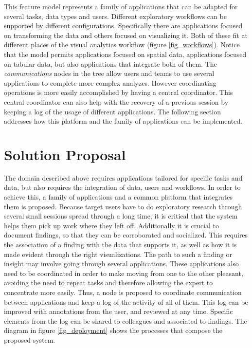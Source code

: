 This feature model represents a family of applications that can be adapted for several tasks, data types and users. Different exploratory workflows can be supported by different configurations. Specifically there are applications focused on transforming the data and others focused on visualizing it. Both of these fit at different places of the visual analytics workflow (figure \ref{fig_workflows}). Notice that the model permits applications focused on spatial data, applications focused on tabular data, but also applications that integrate both of them. The \emph{communications} nodes in the tree allow users and teams to use several applications to complete more complex analyzes. However coordinating operations is more easily accomplished by having a central coordinator. This central coordinator can also help with the recovery of a previous session by keeping a log of the usage of different applications. The following section addresses how this platform and the family of applications can be implemented.







\section{Solution Proposal}

The domain described above requires applications tailored for specific tasks and data, but also requires the integration of data, users and workflows. In order to achieve this, a family of applications and a common platform that integrates them is proposed. Because target users have to do exploratory research through several small sessions spread through a long time, it is critical that the system helps them pick up work where they left off. Additionally it is crucial to document findings, so that they can be corroborated and socialized. This requires the association of a finding with the data that supports it, as well as how it is made evident through the right visualizations. The path to such a finding or insight may involve going through several applications. These applications also need to be coordinated in order to make moving from one to the other pleasant, avoiding the need to repeat tasks and therefore allowing the expert to concentrate more easily. Thus, a node is proposed to coordinate communication between applications and keep a log of the activity of all of them. This log can be improved with annotations from the user, and reviewed at any time. Specific elements from the log can be shared to colleagues and associated to findings. The diagram in figure \ref{fig_deployment} shows the processes that compose the proposed system.

